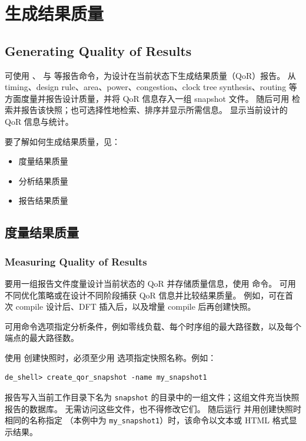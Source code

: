 \section{生成结果质量}
\subsection*{Generating Quality of Results}

可使用 、 与  等报告命令，为设计在当前状态下生成结果质量（QoR）报告。
 从 timing、design rule、area、power、congestion、clock tree synthesis、routing 等方面度量并报告设计质量，并将 QoR 信息存入一组 snapshot 文件。
随后可用  检索并报告该快照；也可选择性地检索、排序并显示所需信息。
 显示当前设计的 QoR 信息与统计。

要了解如何生成结果质量，见：
\begin{itemize}
  \item 度量结果质量
  \item 分析结果质量
  \item 报告结果质量
\end{itemize}

\subsection{度量结果质量}
\subsubsection*{Measuring Quality of Results}

要用一组报告文件度量设计当前状态的 QoR 并存储质量信息，使用  命令。
可用不同优化策略或在设计不同阶段捕获 QoR 信息并比较结果质量。
例如，可在首次 compile 设计后、DFT 插入后，以及增量 compile 后再创建快照。

可用命令选项指定分析条件，例如零线负载、每个时序组的最大路径数，以及每个端点的最大路径数。

使用  创建快照时，必须至少用  选项指定快照名称。例如：
\begin{lstlisting}
de_shell> create_qor_snapshot -name my_snapshot1
\end{lstlisting}

报告写入当前工作目录下名为 \texttt{snapshot} 的目录中的一组文件；这组文件充当快照报告的数据库。
无需访问这些文件，也不得修改它们。
随后运行  并用创建快照时相同的名称指定 （本例中为 \texttt{my\_snapshot1}）时，该命令以文本或 HTML 格式显示结果。

